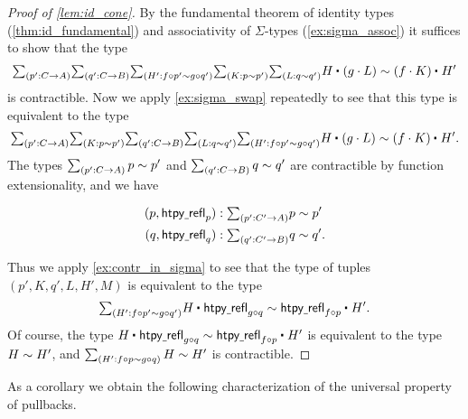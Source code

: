 \begin{proof}[Proof of \cref{lem:id_cone}]
By the fundamental theorem of identity types (\cref{thm:id_fundamental}) and associativity of $\Sigma$-types (\cref{ex:sigma_assoc}) it suffices to show that the type
\begin{equation*}
\sm{p':C\to A}{q':C\to B}{H':f\circ p'\htpy g\circ q'}{K:p\htpy p'}{L:q\htpy q'} \ct{H}{(g\cdot L)} \htpy \ct{(f\cdot K)}{H'}
\end{equation*}
is contractible. Now we apply \cref{ex:sigma_swap} repeatedly to see that this type is equivalent to the type
\begin{equation*}
\sm{p':C\to A}{K: p\htpy p'}{q':C\to B}{L: q\htpy q'}{H':f\circ p'\htpy g\circ q'} \ct{H}{(g\cdot L)} \htpy \ct{(f\cdot K)}{H'}.
\end{equation*}
The types $\sm{p':C\to A} p\htpy p'$ and $\sm{q':C\to B} q\htpy q'$ are contractible by function extensionality, and  we have
\begin{samepage}
\begin{align*}
(p,\htpyrefl_p) & : \sm{p':C'\to A} p\htpy p' \\
(q,\htpyrefl_q) & : \sm{q':C'\to B} q\htpy q'.
\end{align*}%
\end{samepage}%
Thus we apply \cref{ex:contr_in_sigma} to see that the type of tuples $(p',K,q',L,H',M)$ is equivalent to the type
\begin{equation*}
\sm{H':f\circ p'\htpy g\circ q'} \ct{H}{\htpyrefl_{g\circ q}}\htpy \ct{\htpyrefl_{f\circ p}}{H'}.
\end{equation*}
Of course, the type $\ct{H}{\htpyrefl_{g\circ q}}\htpy \ct{\htpyrefl_{f\circ p}}{H'}$ is equivalent to the type $H\sim H'$, and $\sm{H':f\circ p\htpy g\circ q} H\htpy H'$ is contractible.
\end{proof}

As a corollary we obtain the following characterization of the universal property of pullbacks.

